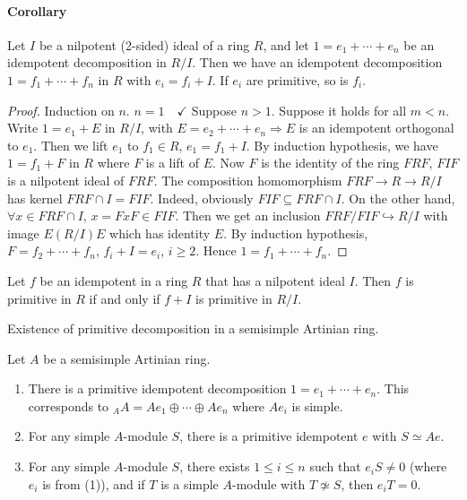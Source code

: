 \documentclass[11pt, a4paper]{report}
\begin{document}
\paragraph{Corollary}
Let $I$ be a nilpotent (2-sided) ideal of a ring $R$, and let $1 = e_{1} + \cdots + e_n$ be an idempotent decomposition in $R/I$. Then we have an idempotent decomposition $1 = f_{1} + \cdots + f_{n}$ in $R$ with $e_{i} = f_{i} + I$. If $e_{i}$ are primitive, so is $f_{i}$.

\begin{proof}
Induction on $n$.
$n = 1 \quad \checkmark$
Suppose $n > 1$. Suppose it holds for all $m < n$.
Write $1 = e_{1} + E$ in $R/I$, with $E = e_{2} + \cdots + e_{n} \Rightarrow E$ is an idempotent orthogonal to $e_1$.
Then we lift $e_{1}$ to $f_{1} \in R$, $e_{1} = f_{1} + I$.
By induction hypothesis, we have $1 = f_{1} + F$ in $R$ where $F$ is a lift of $E$.
Now $F$ is the identity of the ring $FRF$, $FIF$ is a nilpotent ideal of $FRF$. The composition homomorphism
$FRF \rightarrow R \rightarrow R/I$
has kernel $FRF \cap I = FIF$.
Indeed, obviously $FIF \subseteq FRF \cap I$. On the other hand,
$\forall x \in FRF \cap I$, $x = FxF \in FIF$.
Then we get an inclusion $FRF/FIF \hookrightarrow R/I$
with image $E(R/I)E$ which has identity $E$.
By induction hypothesis, $F = f_{2} + \cdots + f_{n}$, $f_{i} + I = e_{i}$, $i \geqslant 2$.
Hence $1 = f_{1} + \cdots + f_{n}$.
\end{proof}

\begin{corollary}
Let $f$ be an idempotent in a ring $R$ that has a nilpotent ideal $I$. Then $f$ is primitive in $R$ if and only if $f + I$ is primitive in $R/I$.
\end{corollary}

\begin{lemma}
Existence of primitive decomposition in a semisimple Artinian ring.
\end{lemma}
Let $A$ be a semisimple Artinian ring.
\begin{enumerate}
\item There is a primitive idempotent decomposition
$1 = e_{1} + \cdots + e_{n}$. This corresponds to ${}_{A}A = Ae_{1} \oplus \cdots \oplus Ae_{n}$ where $Ae_{i}$ is simple.
\item For any simple $A$-module $S$, there is a primitive idempotent $e$ with $S \simeq Ae$.
\item For any simple $A$-module $S$, there exists $1 \leq i \leq n$ such that $e_{i}S \neq 0$ (where $e_{i}$ is from (1)), and if $T$ is a simple $A$-module with $T \not\simeq S$, then $e_{i}T = 0$.
\end{enumerate}
\end{document}
